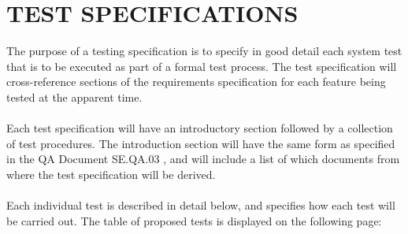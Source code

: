 \documentclass[a4paper]{article}
\begin{document}
\section {TEST SPECIFICATIONS}
The purpose of a testing specification is to specify in good detail each system test that is to be executed as part of a formal test process. The test specification will cross-reference sections of the requirements specification for each feature being tested at the apparent time.
\\\\
Each test specification will have an introductory section followed by a collection of test procedures. The introduction section will have the same form as specified in the QA Document SE.QA.03 \cite{Software Engineering Group Projects. General Documentation Standards.}, and will include a list of which documents from where the test specification will be derived. 
\\\\
Each individual test is described in detail below, and specifies how each test will be carried out. The table of proposed tests is displayed on the following page:

\clearpage
\end{document}
